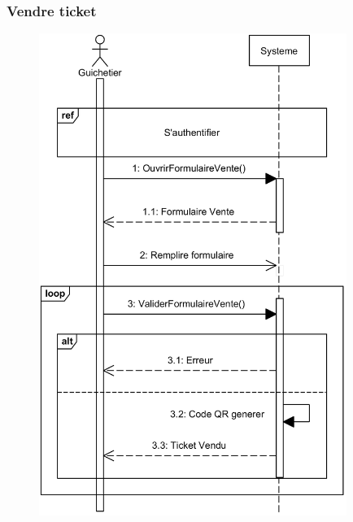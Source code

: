     \subsubsection[Vendre ticket]{Vendre ticket}
        \begin{figure}[H]
            \centering
            \includegraphics[width=100mm]{images/diagramme-de-sequence/sd-vendre-ticket.png}
            \label{fig:sdVendreTicket}
        \end{figure}
\pagebreak
